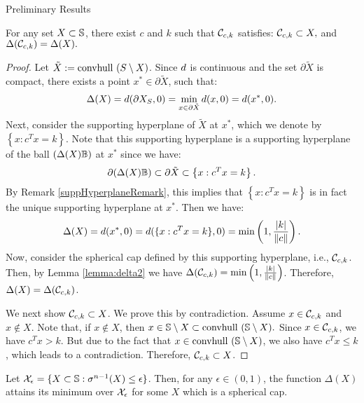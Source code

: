 \begin{subsection}{Preliminary Results}
\begin{lemma}\label{lemma:constructSC}For any set $X \subset \mathbb{S}$, there exist $c$ and $k$ such that $\mathcal{C}_{c,k}$ satisfies: $\mathcal{C}_{c,k} \subset X,$ and $\Delta(\mathcal{C}_{c,k}) = \Delta(X).$
\end{lemma}

\begin{proof} Let $\tilde{X} := \mbox{convhull }(S \setminus X)$.
Since $d$ is continuous and the set $\partial \tilde{X}$ is compact, there exists a point $x^* \in \partial \tilde{X}$, such that:
\begin{eqnarray}\nonumber \Delta(X) = d(\partial X_S, 0) = 
\label{deltaSupporting} \min_{x \in \partial \tilde{X}}d(x, 0) = d(x^*, 0).\end{eqnarray} 
Next, consider the supporting hyperplane of $\tilde{X}$ at $x^*$, which we denote by $\left\{x : c^Tx = k\right\}$. Note that this supporting hyperplane is a supporting hyperplane of the ball $(\Delta(X)\mathbb{B})$ at $x^*$ since we have:
\begin{equation*} \partial (\Delta(X)\mathbb{B}) \subset \partial \tilde{X} \subset \left\{x : c^Tx = k\right\}.\end{equation*}  By Remark \ref{suppHyperplaneRemark}, this implies that $\left\{x : c^Tx = k\right\}$ is in fact the unique supporting hyperplane at $x^*$.
Then we have:
\begin{equation*}\Delta(X) =  d(x^*, 0) = d(\{x : c^Tx = k\}, 0) = \min\left(1, \frac{|k|}{\|c\|}\right).
\end{equation*}
Now, consider the spherical cap defined by this supporting hyperplane, i.e., $\mathcal{C}_{c, k}$. Then, by Lemma \ref{lemma:delta2} we have
$\Delta(\mathcal{C}_{c,k}) =  \min\left(1, \frac{|k|}{\|c\|}\right)$. Therefore, $\Delta(X) = \Delta(\mathcal{C}_{c,k})$.


We next show $\mathcal{C}_{c, k} \subset X$. We prove this by contradiction. Assume $x \in \mathcal{C}_{c,k}$ and $x \notin X$. Note that, if $x \notin X$, then $x \in \mathbb{S} \setminus X \subset \mbox{convhull }(\mathbb{S} \setminus X).$ Since $x \in \mathcal{C}_{c,k}$, we have $c^Tx>k$. But due to the fact that $x \in \mbox{convhull }(\mathbb{S} \setminus X)$, we also have $c^Tx \leq k$, which leads to a contradiction. Therefore, $\mathcal{C}_{c, k} \subset X$. 
\end{proof}

\begin{proposition}\label{thm:mainSphericalCap}Let $\mathcal{X}_{\epsilon} = \{X \subset \mathbb{S}: \sigma^{n-1}(X) \leq \epsilon\}$. Then, for any $\epsilon \in (0,1)$, the function $\Delta(X)$ attains its minimum over $\mathcal{X}_{\epsilon}$ for some $X$ which is a spherical cap.
\end{proposition}


\end{subsection}
